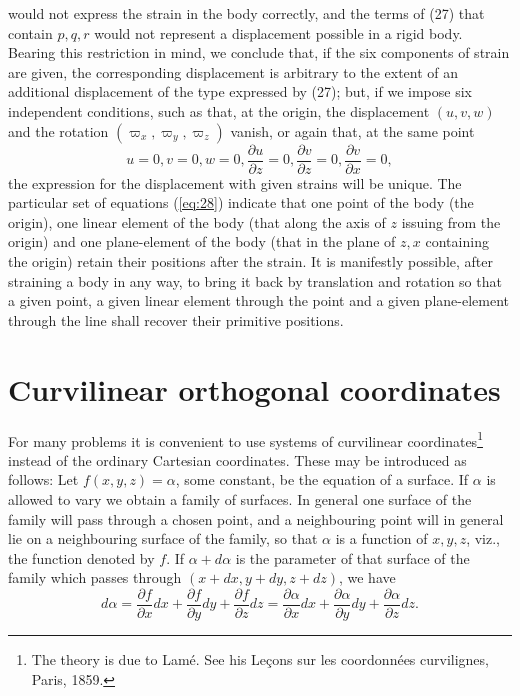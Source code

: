would not express the strain in the body correctly, and the terms of
(27) that contain \(p, q, r\) would not represent a displacement
possible in a rigid body. Bearing this restriction in mind, we conclude
that, if the six components of strain are given, the corresponding
displacement is arbitrary to the extent of an additional displacement of
the type expressed by (27); but, if we impose 
six independent conditions,
such as that, at the origin, the displacement \((u, v, w)\) and the rotation
\(\left(\varpi_x, \varpi_y, \varpi_z\right)\) vanish, or again that, at the
same point
\begin{equation}\label{eq:28}
u=0,v=0,w=0, \frac{\partial u}{\partial z}=0,
\frac{\partial v}{\partial z}=0, \frac{\partial v}{\partial x}=0,
\end{equation}
the expression for the displacement with given strains will be unique.
The particular set of equations (\ref{eq:28}) indicate that one point of the body
(the origin), one linear element of the body (that along the axis of
\(z\) issuing from the origin) and one plane-element of the body (that
in the plane of \(z, x\) containing the origin) retain their positions
after the strain. It is manifestly possible, after straining a body in
any way, to bring it back by translation and rotation so that a given
point, a given linear element through the point and a given
plane-element through the line shall recover their primitive positions.

\section{Curvilinear orthogonal coordinates}
For many problems it is convenient to use systems of curvilinear
coordinates\footnote{The theory is due to Lamé. See his
Leçons sur les coordonnées curvilignes, Paris, 1859.}
instead of the ordinary Cartesian coordinates. These may be
introduced as follows: Let \(f(x, y, z)=\alpha \), some constant,
be the
equation of a surface. If \(\alpha \) is allowed to vary we obtain a
family of surfaces. In general one surface of the family will pass
through a chosen point, and a neighbouring point will in general lie
on
a neighbouring surface of the family, so that \(\alpha \) is a function
of \(x, y, z\), viz., the function denoted by \(f\). If
\(\alpha+d \alpha \) is the parameter of that surface of the family which
passes through \((x+d x, y+d y, z+d z)\), we have
\[
d \alpha=\frac{\partial f}{\partial x} d x+\frac{\partial f}{\partial y} d y+
\frac{\partial f}{\partial z} d z=\frac{\partial \alpha}{\partial x} d x+
\frac{\partial \alpha}{\partial y} d y+\frac{\partial \alpha}{\partial z} d z.
\]


